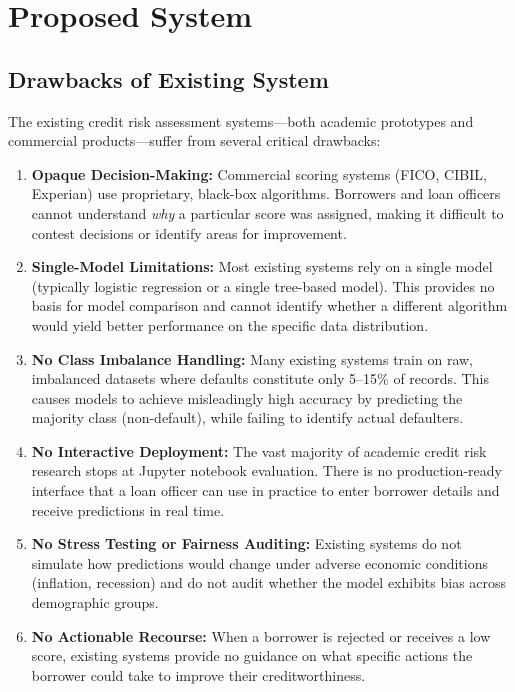 \documentclass[12pt,a4paper]{report}
\begin{document}
\chapter{Proposed System}

\section{Drawbacks of Existing System}

The existing credit risk assessment systems---both academic prototypes and commercial products---suffer from several critical drawbacks:

\begin{enumerate}
    \item \textbf{Opaque Decision-Making:} Commercial scoring systems (FICO, CIBIL, Experian) use proprietary, black-box algorithms. Borrowers and loan officers cannot understand \emph{why} a particular score was assigned, making it difficult to contest decisions or identify areas for improvement.

    \item \textbf{Single-Model Limitations:} Most existing systems rely on a single model (typically logistic regression or a single tree-based model). This provides no basis for model comparison and cannot identify whether a different algorithm would yield better performance on the specific data distribution.

    \item \textbf{No Class Imbalance Handling:} Many existing systems train on raw, imbalanced datasets where defaults constitute only 5--15\% of records. This causes models to achieve misleadingly high accuracy by predicting the majority class (non-default), while failing to identify actual defaulters.

    \item \textbf{No Interactive Deployment:} The vast majority of academic credit risk research stops at Jupyter notebook evaluation. There is no production-ready interface that a loan officer can use in practice to enter borrower details and receive predictions in real time.

    \item \textbf{No Stress Testing or Fairness Auditing:} Existing systems do not simulate how predictions would change under adverse economic conditions (inflation, recession) and do not audit whether the model exhibits bias across demographic groups.

    \item \textbf{No Actionable Recourse:} When a borrower is rejected or receives a low score, existing systems provide no guidance on what specific actions the borrower could take to improve their creditworthiness.
\end{enumerate}
\end{document}
